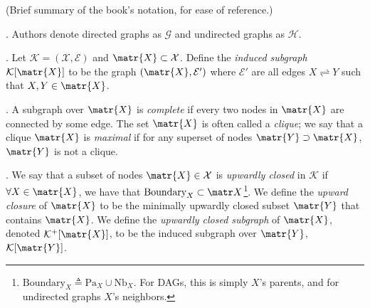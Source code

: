 \documentclass[11pt]{article}
\newcommand\p{\Needspace{10\baselineskip} \noindent}
\begin{document}
\vspace{-1em}
{\footnotesize (Brief summary of the book's notation, for ease of reference.)}

\p {}. Authors denote directed graphs as $\mathcal G$ and undirected graphs as $\mathcal H$. 
\begin{compactitem}
	\item {}. Let $\mathcal K = (\mathcal X, \mathcal E)$ and $\matr{X} \subset \mathcal X$. Define the \textit{induced subgraph} $\mathcal{K}[\matr{X}]$ to be the graph $(\matr{X}, \mathcal{E}')$ where $\mathcal{E}'$ are all edges $X \rightleftharpoons Y$ such that $X, Y \in \matr{X}$.
	
	\item {}. A subgraph over $\matr{X}$ is \textit{complete} if every two nodes in $\matr{X}$ are connected by some edge. The set $\matr{X}$ is often called a \textit{clique}; we say that a clique $\matr{X}$ is \textit{maximal} if for any superset of nodes $\matr{Y} \supset \matr{X}$, $\matr{Y}$ is not a clique.
	
	\item {}. We say that a subset of nodes $\matr{X} \in \mathcal X$ is \textit{upwardly closed} in $\mathcal K$ if $\forall X \in \matr{X}$, we have that $\text{Boundary}_X \subset \matr X$\footnote{$\text{Boundary}_X \triangleq \text{Pa}_X \cup \text{Nb}_X$. For DAGs, this is simply $X$'s parents, and for undirected graphs $X$'s neighbors.}. We define the \textit{upward closure} of $\matr{X}$ to be the minimally upwardly closed subset $\matr{Y}$ that contains $\matr{X}$. We define the \textit{upwardly closed subgraph} of $\matr{X}$, denoted $\mathcal{K}^+[\matr{X}]$, to be the induced subgraph over $\matr{Y}$, $\mathcal{K}[\matr{Y}]$. 
\end{compactitem}
\end{document}
